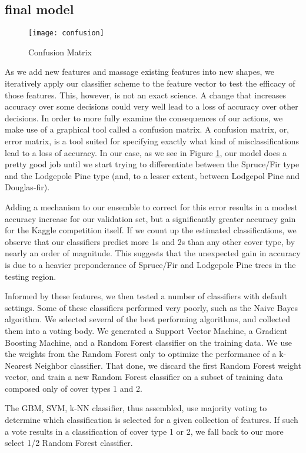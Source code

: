 \subsection{final model}

\begin{figure}[H]
  \texttt{[image: confusion]}
 \caption{Confusion Matrix}
 \label{fig:confusion}
\end{figure}

As we add new features and massage existing features into new shapes, 
we iteratively apply our classifier scheme to the feature vector to 
test the efficacy of those features.  This, however, is not an exact 
science.  A change that increases accuracy over some decisions could 
very well lead to a loss of accuracy over other decisions.  In order to 
more fully examine the consequences of our actions, we make use of a 
graphical tool called a confusion matrix\cite{stehman1997selecting}. A 
confusion matrix, or, error matrix, is a tool suited for specifying 
exactly what kind of misclassifications lead to a loss of accuracy.  
In our case, as we see in Figure \ref{fig:confusion}, our model does a 
pretty good job until we start trying to differentiate between the 
Spruce/Fir type and the Lodgepole Pine type (and, to a lesser extent, 
between Lodgepol Pine and Douglas-fir).  

Adding a mechanism to our ensemble to correct for this error results in 
a modest accuracy increase for our validation set, but a significantly 
greater accuracy gain for the Kaggle competition itself.  If we count 
up the estimated classifications, we observe that our classifiers 
predict more 1s and 2s than any other cover type, by nearly an order of 
magnitude.  This suggests that the unexpected gain in accuracy is due 
to a heavier preponderance of Spruce/Fir and Lodgepole Pine trees in 
the testing region.

Informed by these features, we then tested a number of classifiers with 
default settings.  Some of these classifiers performed very poorly, 
such as the Naive Bayes algorithm.  We selected several of the best 
performing algorithms, and collected them into a voting body.  
We generated a Support Vector Machine, a Gradient Boosting Machine, and 
a Random Forest classifier on the training data.  We use the weights 
from the Random Forest only to optimize the performance of a k-Nearest 
Neighbor classifier.  That done, we discard the first Random Forest 
weight vector, and train a new Random Forest classifier on a subset of 
training data composed only of cover types 1 and 2.

The GBM, SVM, k-NN classifier, thus assembled, use majority voting to 
determine which classification is selected for a given collection of 
features.  If such a vote results in a classification of cover type 1 
or 2, we fall back to our more select 1/2 Random Forest classifier.


